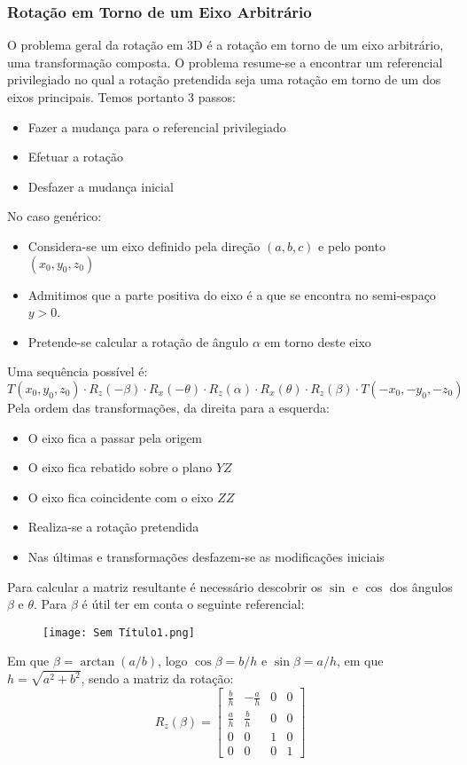 \documentclass[10pt,a4paper]{report}
\begin{document}
\subsubsection{Rotação em Torno de um Eixo Arbitrário}
O problema geral da rotação em 3D é a rotação em torno de um eixo arbitrário, uma transformação composta. O problema resume-se a encontrar um referencial privilegiado no qual a rotação pretendida seja uma rotação em torno de um dos eixos principais. Temos portanto 3 passos:
\begin{itemize}
\item Fazer a mudança para o referencial privilegiado
\item Efetuar a rotação
\item Desfazer a mudança inicial
\end{itemize}
No caso genérico:
\begin{itemize}
\item Considera-se um eixo definido pela direção $(a,b,c)$ e pelo ponto $(x_0,y_0,z_0)$
\item Admitimos que a parte positiva do eixo é a que se encontra no semi-espaço $y>0$.
\item Pretende-se calcular a rotação de ângulo $\alpha$ em torno deste eixo
\end{itemize}
Uma sequência possível é:
$$
T(x_0,y_0,z_0) \cdot R_z(-\beta) \cdot R_x(-\theta) \cdot R_z(\alpha) \cdot R_x(\theta) \cdot R_z(\beta) \cdot T(-x_0,-y_0,-z_0)
$$
Pela ordem das transformações, da direita para a esquerda:
\begin{itemize}
\item O eixo fica a passar pela origem
\item O eixo fica rebatido sobre o plano $YZ$
\item O eixo fica coincidente com o eixo $ZZ$
\item Realiza-se a rotação pretendida
\item Nas últimas e transformações desfazem-se as modificações iniciais
\end{itemize}
Para calcular a matriz resultante é necessário descobrir os $\sin$ e $\cos$ dos ângulos $\beta$ e $\theta$. Para $\beta$ é útil ter em conta o seguinte referencial:
\begin{figure}[H]
\centering
\texttt{[image: Sem Título1.png]}
\end{figure}
Em que $\beta = \arctan(a/b)$, logo $\cos \beta = b/h$ e $\sin \beta = a/h$, em que $h = \sqrt{a^2+b^2}$, sendo a matriz da rotação:
$$
R_z(\beta) = \begin{bmatrix}
\frac{b}{h} & -\frac{a}{h} & 0 & 0\\
\frac{a}{h} & \frac{b}{h} & 0 & 0\\
0 & 0 & 1 & 0\\
0 & 0 & 0 & 1
\end{bmatrix}
$$
\end{document}
